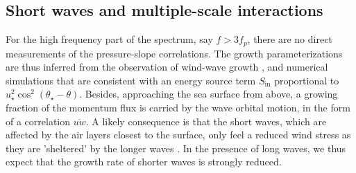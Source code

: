 \subsection{Short waves and multiple-scale interactions}
For the high frequency part of the spectrum, say $f> 3f_p$, there are no direct measurements of the pressure-slope correlations. The growth parameterizations 
are thus inferred from the observation of wind-wave growth \citep[e.g.][]{Plant1982}, and numerical simulations 
that are consistent with an energy source term $S_{\mathrm{in}}$ proportional to $u_\star^2 \cos^2
\left(\theta_\star - \theta\right)$. Besides, approaching the sea surface from above, a growing fraction of the momentum flux is carried by the wave orbital motion, in the 
form of a correlation $\overline{u w}$. A likely consequence is that the short waves, which are affected by the air layers closest to the 
surface, only feel a reduced wind stress as they are 'sheltered' by the longer waves  \citep{Hara&Belcher2002}.
In the presence of long waves, we thus expect that the growth rate of shorter waves is strongly reduced. 
